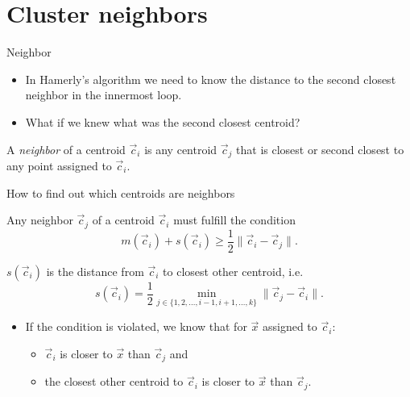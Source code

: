 \documentclass[10pt, compress]{beamer}
\newcommand{\x}{\vec{x}}
\newcommand{\cj}{\vec{c}_j}
\newcommand{\ci}{\vec{c}_i}
\newcommand{\sci}{s(\ci)}
\begin{document}

\section{Cluster neighbors}

\begin{frame}{Neighbor}
  \begin{itemize}
    \item In Hamerly's algorithm we need to know the distance to the second closest neighbor in the innermost loop.
    \item What if we knew what was the second closest centroid?
  \end{itemize}
  \begin{definition}
    A \emph{neighbor} of a centroid $\ci$ is any centroid $\cj$
    that is closest or second closest to any point assigned to $\ci$.
  \end{definition}
\end{frame}

\begin{frame}{How to find out which centroids are neighbors}
  \begin{theorem}
    Any neighbor $\cj$ of a centroid $\ci$ must fulfill the condition
    \begin{equation}
      m(\ci) + s(\ci) \geq \frac{1}{2} \| \ci - \cj \|.
    \end{equation}
  \end{theorem}
  $\sci$ is the distance from $\ci$ to closest other centroid, i.e.
  \begin{equation}
    \sci = \frac{1}{2} \min_{j \in \{1,2, \ldots, i-1, i+1, \ldots, k\}} \| \cj - \ci \|.
  \end{equation}
  
    \begin{itemize}
    \item If the condition is violated, we know that for $\x$ assigned to $\ci$:
    \begin{itemize}
      \item $\ci$ is closer to $\x$ than $\cj$ and
      \item the closest other centroid to $\ci$ is closer to $\x$ than $\cj$.
    \end{itemize}
  \end{itemize}
\end{frame}
\end{document}
